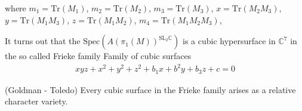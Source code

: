 where 
$ m_{1} = \mathrm{Tr}(M_{1} ) $, 
$ m_{2} = \mathrm{Tr}(M_{2} ) $, 
$ m_{3} = \mathrm{Tr}(M_{3} ) $, 
$ x = \mathrm{Tr}(M_{2}M_{3} ) $, 
$ y = \mathrm{Tr}(M_{1}M_{3} ) $, 
$ z = \mathrm{Tr}(M_{1}M_{2} ) $, 
$ m_{4} = \mathrm{Tr}(M_{1}M_{2}M_{3} ) $, 


It turns out that the
$ \mathrm{Spec}(A(\pi_1(M))^{\mathrm{SL}_2 \mathbb{C} } ) $ is a cubic hypersurface in $\mathbb{C} ^7 $
in the so called Frieke family 
Family of cubic surfaces 
\begin{align}
    xyz + x^2 + y^2 + z^2 + b_1 x + b^2 y + b_3 z +c = 0 
\end{align}

\begin{theorem}
    (Goldman - Toledo) 
    Every cubic surface in the Frieke family arises as a relative character variety.
\end{theorem}







 

